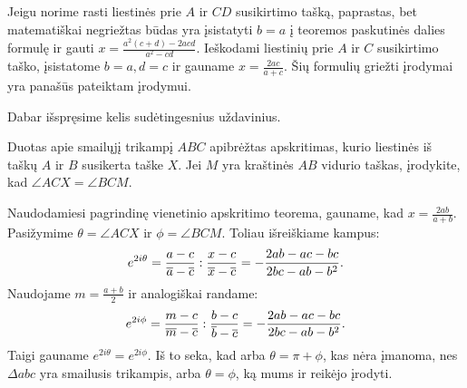 \documentclass[11pt,a4paper,twoside]{book}
\begin{document}
Jeigu norime rasti liestinės prie $A$ ir $CD$ susikirtimo tašką, paprastas, bet matematiškai negriežtas būdas yra įsistatyti $b=a$ į teoremos paskutinės dalies formulę ir gauti $x=\frac{a^2(c+d) - 2acd}{a^2 - cd}$. Ieškodami liestinių prie $A$ ir $C$ susikirtimo taško, įsistatome $b=a, d=c$ ir gauname $x=\frac{2ac}{a+c}$. Šių formulių griežti įrodymai yra panašūs pateiktam įrodymui.
\bigskip

Dabar išspręsime kelis sudėtingesnius uždavinius.







\begin{pavnr} 
Duotas apie smailųjį trikampį $ABC$ apibrėžtas apskritimas, kurio liestinės iš taškų $A$ ir $B$ susikerta taške $X$. Jei $M$ yra kraštinės $AB$ vidurio taškas, įrodykite, kad $\angle ACX = \angle BCM$.
\end{pavnr}
\begin{sprendimas}
Naudodamiesi pagrindinę vienetinio apskritimo teorema, gauname, kad $ x= \frac {2ab}{a+b}$. Pasižymime $\theta = \angle ACX$ ir $\phi = \angle BCM$. Toliau išreiškiame kampus:
$$ e^{ 2i\theta} = \frac { a-c}{ \overline a - \overline c} : \frac {x-c}{\overline x - \overline c}=
- \frac { 2ab -ac-bc}{2bc - ab- b^2}.$$
Naudojame $m = \frac {a+b}{2}$ ir analogiškai randame:
$$ e^{2i\phi} = \frac { m-c}{ \overline m - \overline c} : \frac {b-c}{\overline b - \overline c}=
- \frac { 2ab -ac-bc}{2bc - ab- b^2}.$$
Taigi gauname $ e^{ 2i\theta} = e^{2i\phi}$. Iš to seka, kad arba $ \theta = \pi + \phi$, kas nėra įmanoma, nes $\Delta abc$ yra smailusis trikampis, arba $\theta =\phi$, ką mums ir reikėjo įrodyti.

\end{sprendimas}
\end{document}
